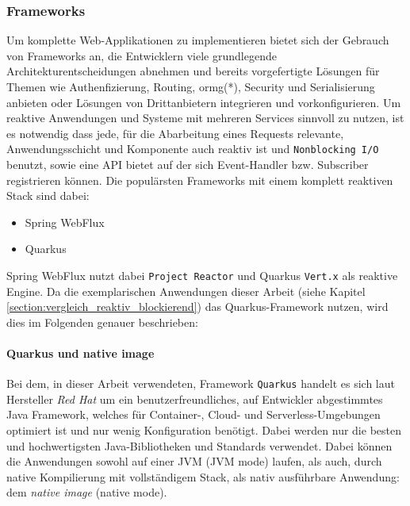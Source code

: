 \subsubsection{Frameworks}
\label{subsubsec:frameworks}
Um komplette Web-Applikationen zu implementieren bietet sich der Gebrauch von Frameworks an, die Entwicklern viele grundlegende Architekturentscheidungen
abnehmen und bereits vorgefertigte Lösungen für Themen wie Authenfizierung, Routing, \Gls{ormg}(*), Security und Serialisierung anbieten oder
Lösungen von Drittanbietern integrieren und vorkonfigurieren.
Um reaktive Anwendungen und Systeme mit mehreren Services sinnvoll zu nutzen, ist es notwendig dass jede, für die Abarbeitung eines Requests relevante,
Anwendungsschicht und Komponente auch reaktiv ist und \verb|Nonblocking I/O| benutzt, sowie eine API bietet auf der
sich Event-Handler bzw. Subscriber registrieren können.\newline
Die populärsten Frameworks mit einem komplett reaktiven Stack sind dabei:

\begin{itemize}
  \item Spring WebFlux
  \item Quarkus
\end{itemize}

Spring WebFlux nutzt dabei \verb|Project Reactor| und Quarkus \verb|Vert.x| als reaktive Engine. \parencite{QuarkusReactiveGettingStarted}
Da die exemplarischen Anwendungen dieser Arbeit (siehe Kapitel \ref{section:vergleich_reaktiv_blockierend}) das Quarkus-Framework nutzen, wird dies
im Folgenden genauer beschrieben:
\paragraph{Quarkus und native image}

Bei dem, in dieser Arbeit verwendeten, Framework \verb|Quarkus| handelt es sich laut Hersteller \textit{Red Hat} um ein
benutzerfreundliches, auf Entwickler abgestimmtes Java Framework, welches für Container-, Cloud- und Serverless-Umgebungen optimiert ist und nur wenig
Konfiguration benötigt. Dabei werden nur die besten und hochwertigsten Java-Bibliotheken und Standards verwendet.
Dabei können die Anwendungen sowohl auf einer JVM (JVM mode) laufen, als auch, durch native Kompilierung mit vollständigem Stack,
als nativ ausführbare Anwendung: dem \textit{native image} (native mode).

